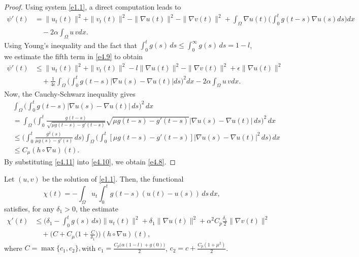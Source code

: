 \begin{proof}
Using system \eqref{e1.1}, a direct computation leads to
\begin{equation}
\begin{aligned}
 \psi'(t) &= \| u_t(t) \|^2 + \| v_t(t) \|^2 -\| \nabla u(t) \|^2
  -\| \nabla v(t) \|^2 + \int_{\Omega} \nabla u(t)
  \Big( \int_0^t g(t - s) \nabla u(s) ds \Big) dx \\
&\quad - 2 \alpha\int_{\Omega} u \, v dx.
\end{aligned} \label{e4.9}
\end{equation}
Using Young's inequality and the fact that
$\int_0^t g(s) \, ds \leq \int_0^{\infty} g(s) \, ds = 1 - l$, we
estimate the fifth term in \eqref{e4.9} to  obtain
\begin{equation}
\begin{aligned}
 \psi'(t) &\leq \| u_t(t) \|^2 + \| v_t(t) \|^2 - l \| \nabla u(t)\|^2
 -\| \nabla v(t) \|^2 + \epsilon \| \nabla u(t) \|^2\\
&\quad +\frac{1}{4\epsilon} \int_{\Omega}
 \Big( \int_0^t g(t - s) |\nabla u(s) - \nabla u(t)| ds \Big)^2 dx
 - 2 \alpha\int_{\Omega} u \, v dx.
\end{aligned}\label{e4.10}
\end{equation}
 Now, the  Cauchy-Schwarz inequality gives
\begin{equation}
\begin{aligned}
&\int_{\Omega} \Big( \int_0^{t} g(t - s) |\nabla u(s) - \nabla u(t)| \, ds \Big)^2
 \, dx \\
&=\int_{\Omega} \Big(\int_0^{t} \frac{g(t - s)}{\sqrt{\mu g(t - s)
 - g'(t - s)}} \sqrt{\mu g(t - s) - g'(t - s)} |\nabla u(s) - \nabla u(t)| \, ds \Big)^2
   \, dx\\
&\leq \Big( \int_0^{t} \frac{g^2(s)}{\mu g(s) - g'(s)} \, ds \Big)
 \int_{\Omega} \Big( \int_0^{t} [\mu g(t - s) - g'(t - s)] |\nabla u(s)
 - \nabla u(t)|^2 \, ds \Big) \, dx \\
&\leq C_\mu (h \circ \nabla u)(t).
\end{aligned} \label{e4.11}
\end{equation}
By substituting \eqref{e4.11} into \eqref{e4.10}, we obtain \eqref{e4.8}.
\end{proof}

\begin{lemma}  \label{lem8}
Let $(u, v)$ be the solution of \eqref{e1.1}. Then, the functional
\[
 \chi(t) = -\int_{\Omega} u_t \int_0^t g(t - s)(u(t) - u(s)) \, ds \, dx,
\]
satisfies, for any $ \delta_{1} > 0$, the estimate
\begin{equation}
\begin{aligned}
 \chi'(t) &\leq  \Big(\delta_{1} - \int_0^t g(s) \, ds \Big) \| u_t (t)\|^2
  + \delta_{1} \| \nabla u (t) \|^2
  +\alpha^2 C_p \frac{\delta_{1}}{2} \| \nabla v (t)\|^2 \\
&\quad +\Big(C+ C_\mu \Big( 1+ \frac{C}{ \delta_{1}}\Big) \Big)
 (h \circ \nabla u)(t),
\end{aligned} \label{e4.12}
\end{equation}
 where $C=\max\{c_1,c_2\},$\quad with $c_1=\frac{C_{p}\big(\alpha(1-l)+g(0)\big)}{2}$,
 $c_2= c+\frac{C_{p}(1+\mu^2)}{2}$.
\end{lemma}

